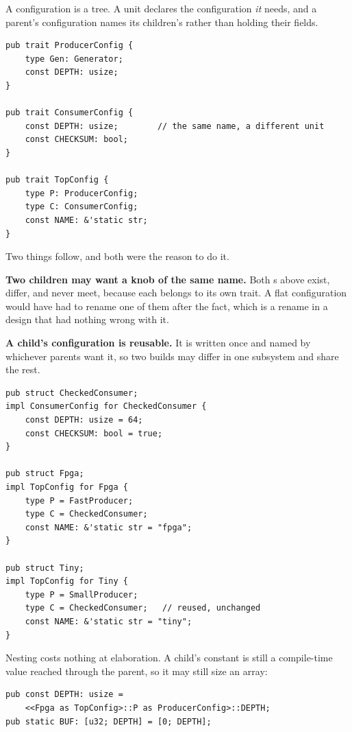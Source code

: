A configuration is a tree. A unit declares the configuration \emph{it}
needs, and a parent's configuration names its children's rather than
holding their fields.

\begin{lstlisting}[caption={Each unit declares what it needs. The parent names its children's configurations and never mentions their knobs.},label={lst:nestedcfg}]
pub trait ProducerConfig {
    type Gen: Generator;
    const DEPTH: usize;
}

pub trait ConsumerConfig {
    const DEPTH: usize;        // the same name, a different unit
    const CHECKSUM: bool;
}

pub trait TopConfig {
    type P: ProducerConfig;
    type C: ConsumerConfig;
    const NAME: &'static str;
}
\end{lstlisting}

Two things follow, and both were the reason to do it.

\textbf{Two children may want a knob of the same name.} Both
s above exist, differ, and never meet, because each belongs
to its own trait. A flat configuration would have had to rename one of
them after the fact, which is a rename in a design that had nothing wrong
with it.

\textbf{A child's configuration is reusable.} It is written once and
named by whichever parents want it, so two builds may differ in one
subsystem and share the rest.

\begin{lstlisting}[caption={Two builds. The consumer's configuration is written once and used by both; only the producer differs.},label={lst:nestedbuilds}]
pub struct CheckedConsumer;
impl ConsumerConfig for CheckedConsumer {
    const DEPTH: usize = 64;
    const CHECKSUM: bool = true;
}

pub struct Fpga;
impl TopConfig for Fpga {
    type P = FastProducer;
    type C = CheckedConsumer;
    const NAME: &'static str = "fpga";
}

pub struct Tiny;
impl TopConfig for Tiny {
    type P = SmallProducer;
    type C = CheckedConsumer;   // reused, unchanged
    const NAME: &'static str = "tiny";
}
\end{lstlisting}

Nesting costs nothing at elaboration. A child's constant is still a
compile-time value reached through the parent, so it may still size an
array:

\begin{lstlisting}[caption={A child's constant, reached through the parent, still sizes an array. This is the long spelling.},label={lst:nestedconst}]
pub const DEPTH: usize =
    <<Fpga as TopConfig>::P as ProducerConfig>::DEPTH;
pub static BUF: [u32; DEPTH] = [0; DEPTH];
\end{lstlisting}

